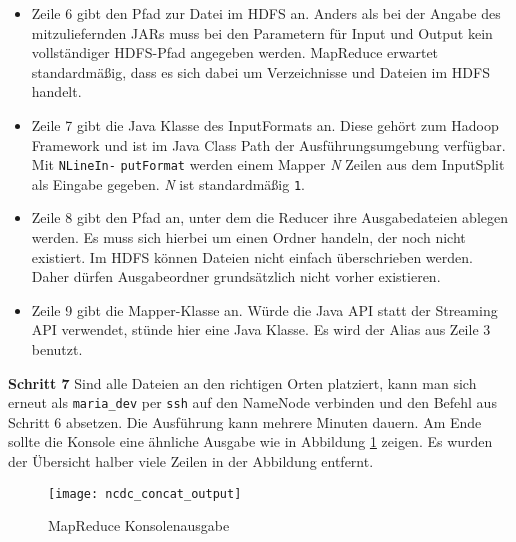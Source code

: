 \begin{itemize}
    \item Zeile 6 gibt den Pfad zur Datei im HDFS an. Anders als bei der Angabe des mitzuliefernden JARs muss bei den Parametern für Input und Output kein vollständiger HDFS-Pfad angegeben werden. MapReduce erwartet standardmäßig, dass es sich dabei um Verzeichnisse und Dateien im HDFS handelt.
    \item Zeile 7 gibt die Java Klasse des InputFormats an. Diese gehört zum Hadoop Framework und ist im Java Class Path der Ausführungsumgebung verfügbar. Mit \verb|NLineIn-| \verb|putFormat| werden einem Mapper \textit{N} Zeilen aus dem InputSplit als Eingabe gegeben. \textit{N} ist standardmäßig \verb|1|. 
    \item Zeile 8 gibt den Pfad an, unter dem die Reducer ihre Ausgabedateien ablegen werden. Es muss sich hierbei um einen Ordner handeln, der noch nicht existiert. Im HDFS können Dateien nicht einfach überschrieben werden. Daher dürfen Ausgabeordner grundsätzlich nicht vorher existieren.
    \item Zeile 9 gibt die Mapper-Klasse an. Würde die Java API statt der Streaming API verwendet, stünde hier eine Java Klasse. Es wird der Alias aus Zeile 3 benutzt.
\end{itemize}



\textbf{Schritt 7} 
Sind alle Dateien an den richtigen Orten platziert, kann man sich erneut als \verb|maria_dev| per \verb|ssh| auf den NameNode verbinden und den Befehl aus Schritt 6 absetzen. Die Ausführung kann mehrere Minuten dauern. Am Ende sollte die Konsole eine ähnliche Ausgabe wie in Abbildung \ref{fig:ncdc concat console output} zeigen. Es wurden der Übersicht halber viele Zeilen in der Abbildung entfernt.

\begin{figure}[ht]
    \centering
    \texttt{[image: ncdc\_concat\_output]}
    \caption[MapReduce Konsolenausgabe]{MapReduce Konsolenausgabe}
    \label{fig:ncdc concat console output}
\end{figure}

